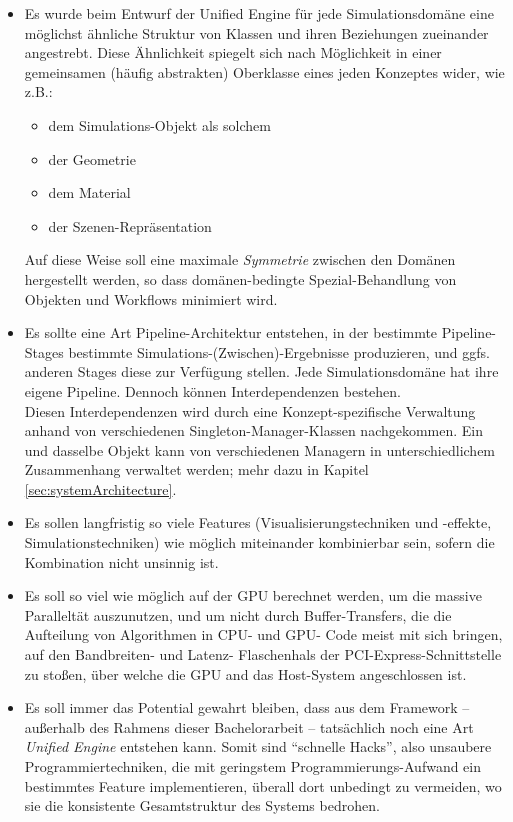 \begin{itemize}
	\item Es wurde beim Entwurf der Unified Engine für jede Simulationsdomäne eine möglichst ähnliche Struktur von Klassen 	
	und ihren Beziehungen zueinander angestrebt. Diese Ähnlichkeit spiegelt sich nach Möglichkeit in einer gemeinsamen 	
	(häufig abstrakten) Oberklasse eines jeden Konzeptes wider, wie z.B.:
	\begin{itemize}
		\item dem Simulations-Objekt als solchem
		\item der Geometrie
		\item dem Material
		\item der Szenen-Repräsentation
	\end{itemize}
	Auf diese Weise soll eine maximale \emph{Symmetrie} zwischen den Domänen hergestellt werden, so dass domänen-bedingte 
	Spezial-Behandlung von Objekten und Workflows minimiert wird.

	\item Es sollte eine Art Pipeline-Architektur entstehen, in der bestimmte Pipeline-Stages bestimmte 
	Simulations-(Zwischen)-Ergebnisse produzieren, und ggfs. anderen Stages diese zur Verfügung stellen. 
	Jede Simulationsdomäne hat ihre eigene Pipeline. Dennoch können Interdependenzen bestehen.\\
	Diesen Interdependenzen wird durch eine Konzept-spezifische Verwaltung anhand von verschiedenen 
	Singleton-Manager-Klassen nachgekommen. 
	Ein und dasselbe Objekt kann von verschiedenen Managern in unterschiedlichem Zusammenhang verwaltet 
	werden; mehr dazu in Kapitel \ref{sec:systemArchitecture}.

	\item Es sollen langfristig so viele Features (Visualisierungstechniken und -effekte, Simulationstechniken) wie möglich 
	miteinander kombinierbar sein, sofern die Kombination nicht unsinnig ist.

	\item Es soll so viel wie möglich auf der GPU berechnet werden, um die massive Paralleltät auszunutzen, 
	und um nicht durch Buffer-Transfers, die die Aufteilung von Algorithmen in CPU- und GPU- Code meist mit sich bringen, 	
	auf den Bandbreiten- und Latenz- Flaschenhals der PCI-Express-Schnittstelle zu stoßen, über welche die GPU
	and das Host-System angeschlossen ist.
	
	
	\item Es soll immer das Potential gewahrt bleiben, dass aus dem Framework -- außerhalb des Rahmens dieser 
	Bachelorarbeit -- tatsächlich noch eine Art \emph{Unified Engine} entstehen kann. Somit sind "`schnelle Hacks"',
	also unsaubere Programmiertechniken, die mit geringstem Programmierungs-Aufwand ein bestimmtes Feature implementieren,
	überall dort unbedingt zu vermeiden, wo sie die konsistente Gesamtstruktur des Systems bedrohen.

\end{itemize}



